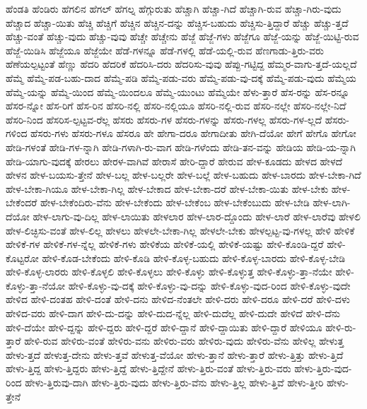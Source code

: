{ಹೆಂಡತಿ
ಹೆಂಡಿರು
ಹೆಗಲಿನ
ಹೆಗಲ್
ಹೆಗಲ್ನ
ಹೆಗ್ಗುರುತು
ಹೆಚ್ಚಾಗಿ
ಹೆಚ್ಚಾ-ಗಿದೆ
ಹೆಚ್ಚಾಗಿ-ರುವ
ಹೆಚ್ಚಾ-ಗಿರು-ವುದು
ಹೆಚ್ಚಾದ
ಹೆಚ್ಚಾ-ಯಿತು
ಹೆಚ್ಚಿ
ಹೆಚ್ಚಿಗೆ
ಹೆಚ್ಚಿನ
ಹೆಚ್ಚಿನ-ದನ್ನು
ಹೆಚ್ಚಿಸ-ಬಹುದು
ಹೆಚ್ಚಿಸು-ತ್ತಿದ್ದಾರೆ
ಹೆಚ್ಚು
ಹೆಚ್ಚು-ತ್ತದೆ
ಹೆಚ್ಚು-ವಂತೆ
ಹೆಚ್ಚು-ವುದು
ಹೆಚ್ಚು-ವುವು
ಹೆಚ್ಚೇ
ಹೆಚ್ಚೇನು
ಹೆಜ್ಜೆ
ಹೆಜ್ಜೆ-ಗಳು
ಹೆಜ್ಜೆಗೂ
ಹೆಜ್ಜೆ-ಯನ್ನು
ಹೆಜ್ಜೆ-ಯಿಟ್ಟಿ-ರುವ
ಹೆಜ್ಜೆ-ಯಿಡಿಸಿ
ಹೆಜ್ಜೆಯೂ
ಹೆಜ್ಜೆಯೇ
ಹೆಡೆ-ಗಳನ್ನೂ
ಹೆಡೆ-ಗಳಲ್ಲಿ
ಹೆಡೆ-ಯಲ್ಲಿ-ರುವ
ಹೆಣಗಾಡು-ತ್ತಿರು-ವರು
ಹೆಣೆಯಲ್ಪಟ್ಟಂತೆ
ಹೆಣ್ಣು
ಹೆದರಿ
ಹೆದರಿಕೆ
ಹೆದರಿಸಿ-ದರು
ಹೆದರಿಸು-ವುವು
ಹೆಪ್ಪು-ಗಟ್ಟಿದ್ದ
ಹೆಮ್ಮರ-ವಾಗು-ತ್ತದೆ-ಯಲ್ಲದೆ
ಹೆಮ್ಮೆ
ಹೆಮ್ಮೆ-ಪಡ-ಬಹು-ದಾದ
ಹೆಮ್ಮೆ-ಪಡಿ
ಹೆಮ್ಮೆ-ಪಡು-ವರು
ಹೆಮ್ಮೆ-ಪಡು-ವು-ದಕ್ಕೆ
ಹೆಮ್ಮೆ-ಪಡು-ವುದು
ಹೆಮ್ಮೆಯ
ಹೆಮ್ಮೆ-ಯನ್ನು
ಹೆಮ್ಮೆ-ಯಿಂದ
ಹೆಮ್ಮೆ-ಯಿಂದಲೂ
ಹೆಮ್ಮೆ-ಯುಂಟು
ಹೆಮ್ಮೆಯೇ
ಹೆಳು-ತ್ತಾರೆ
ಹೆಸ-ರನ್ನು
ಹೆಸ-ರನ್ನೂ
ಹೆಸರ-ನ್ನೋ
ಹೆಸ-ರಿಗೆ
ಹೆಸ-ರಿನ
ಹೆಸರಿ-ನಲ್ಲಿ
ಹೆಸರಿ-ನಲ್ಲಿಯೂ
ಹೆಸರಿ-ನಲ್ಲಿ-ರುವ
ಹೆಸರಿ-ನಲ್ಲೇ
ಹೆಸರಿ-ನಲ್ಲೇ-ನಿದೆ
ಹೆಸರಿ-ನಿಂದ
ಹೆಸರಿಸ-ಲ್ಪಟ್ಟವ-ರೆಲ್ಲ
ಹೆಸರು
ಹೆಸರು-ಗಳ
ಹೆಸರು-ಗಳನ್ನು
ಹೆಸರು-ಗಳಲ್ಲ
ಹೆಸರು-ಗಳ-ಲ್ಲದೆ
ಹೆಸರು-ಗಳಿಂದ
ಹೆಸರು-ಗಳು
ಹೆಸರು-ಗಳೂ
ಹೆಸರೂ
ಹೇ
ಹೇಗಾ-ದರೂ
ಹೇಗಾದೀತು
ಹೇಗಿ-ದೆಯೋ
ಹೇಗೆ
ಹೇಗೊ
ಹೇಗೋ
ಹೇಡಿ-ಗಳಂತೆ
ಹೇಡಿ-ಗಳ-ನ್ನಾಗಿ
ಹೇಡಿ-ಗಳಾಗಿ-ರು-ವಾಗ
ಹೇಡಿ-ಗಳೆಂದು
ಹೇಡಿ-ತನ-ವನ್ನು
ಹೇಡಿಯ
ಹೇಡಿ-ಯ-ನ್ನಾಗಿ
ಹೇಡಿ-ಯಾಗು-ವುದಕ್ಕೆ
ಹೇರಲು
ಹೇರಳ-ವಾಗಿವೆ
ಹೇರಾಸೆ
ಹೇರಿ-ದ್ದಾರೆ
ಹೇರುವ
ಹೇಳ-ಕೂಡದು
ಹೇಳದ
ಹೇಳದೆ
ಹೇಳನ
ಹೇಳ-ಬಯಸು-ತ್ತೇನೆ
ಹೇಳ-ಬಲ್ಲ
ಹೇಳ-ಬಲ್ಲರೇ
ಹೇಳ-ಬಲ್ಲೆ
ಹೇಳ-ಬಹುದು
ಹೇಳ-ಬಾರದು
ಹೇಳ-ಬೇಕಾ-ಗಿದೆ
ಹೇಳ-ಬೇಕಾ-ಗಿಯೂ
ಹೇಳ-ಬೇಕಾ-ಗಿಲ್ಲ
ಹೇಳ-ಬೇಕಾದ
ಹೇಳ-ಬೇಕಾ-ದರೆ
ಹೇಳ-ಬೇಕಾ-ಯಿತು
ಹೇಳ-ಬೇಕು
ಹೇಳ-ಬೇಕೆಂದರೆ
ಹೇಳ-ಬೇಕೆಂದಿರು-ವೆನು
ಹೇಳ-ಬೇಕೆಂದು
ಹೇಳ-ಬೇಕೆಂಬ
ಹೇಳ-ಬೇಕೆಂಬುದು
ಹೇಳ-ಬೇಡಿ
ಹೇಳ-ಲಾಗಿ-ದೆಯೋ
ಹೇಳ-ಲಾಗು-ವು-ದಿಲ್ಲ
ಹೇಳ-ಲಾಯಿತು
ಹೇಳಲಾರ
ಹೇಳ-ಲಾರ-ದ್ದೊಂದು
ಹೇಳ-ಲಾರೆ
ಹೇಳ-ಲಾರೆವು
ಹೇಳಲಿ
ಹೇಳ-ಲಿಚ್ಛಿಸು-ವಂತೆ
ಹೇಳ-ಲಿಲ್ಲ
ಹೇಳಲು
ಹೇಳಲೇ-ಬೇಕಾ-ಗಿಲ್ಲ
ಹೇಳಲೇ-ಬೇಕು
ಹೇಳಲ್ಪಟ್ಟ-ವು-ಗಳಲ್ಲ
ಹೇಳಿ
ಹೇಳಿಕೆ
ಹೇಳಿಕೆ-ಗಳ
ಹೇಳಿಕೆ-ಗಳ-ನ್ನೆಲ್ಲ
ಹೇಳಿಕೆ-ಗಳು
ಹೇಳಿಕೆಯ
ಹೇಳಿಕೆ-ಯಲ್ಲಿ
ಹೇಳಿಕೆ-ಯಷ್ಟು
ಹೇಳಿ-ಕೊಂಡಿ-ದ್ದರೆ
ಹೇಳಿ-ಕೊಟ್ಟರೋ
ಹೇಳಿ-ಕೊಡ-ಬೇಕೆಂದು
ಹೇಳಿ-ಕೊಡಿ
ಹೇಳಿ-ಕೊಳ್ಳ-ಬಹುದು
ಹೇಳಿ-ಕೊಳ್ಳ-ಬಾರದು
ಹೇಳಿ-ಕೊಳ್ಳ-ಬೇಡಿ
ಹೇಳಿ-ಕೊಳ್ಳ-ಲಾರರು
ಹೇಳಿ-ಕೊಳ್ಳಲಿ
ಹೇಳಿ-ಕೊಳ್ಳಲು
ಹೇಳಿ-ಕೊಳ್ಳು
ಹೇಳಿ-ಕೊಳ್ಳುತ್ತ
ಹೇಳಿ-ಕೊಳ್ಳು-ತ್ತಾ-ನೆಯೇ
ಹೇಳಿ-ಕೊಳ್ಳು-ತ್ತಾ-ನೆಯೋ
ಹೇಳಿ-ಕೊಳ್ಳು-ವು-ದಕ್ಕೆ
ಹೇಳಿ-ಕೊಳ್ಳು-ವು-ದನ್ನು
ಹೇಳಿ-ಕೊಳ್ಳು-ವುದ-ರಿಂದ
ಹೇಳಿ-ಕೊಳ್ಳು-ವುದೇ
ಹೇಳಿದ
ಹೇಳಿ-ದಂತಹ
ಹೇಳಿ-ದಂತೆ
ಹೇಳಿ-ದನು
ಹೇಳಿದ-ನೆಂತಲೇ
ಹೇಳಿ-ದರು
ಹೇಳಿ-ದರೂ
ಹೇಳಿ-ದರೆ
ಹೇಳಿ-ದಳು
ಹೇಳಿದ-ವರು
ಹೇಳಿ-ದಾಗ
ಹೇಳಿ-ದು-ದನ್ನು
ಹೇಳಿ-ದುದ-ನ್ನೆಲ್ಲ
ಹೇಳಿ-ದುದೆಲ್ಲ
ಹೇಳಿ-ದುದೇ
ಹೇಳಿದೆ
ಹೇಳಿ-ದೆನು
ಹೇಳಿ-ದೆಯೇ
ಹೇಳಿ-ದ್ದನ್ನು
ಹೇಳಿ-ದ್ದರು
ಹೇಳಿ-ದ್ದರೆ
ಹೇಳಿ-ದ್ದಾನೆ
ಹೇಳಿ-ದ್ದಾಯಿತು
ಹೇಳಿ-ದ್ದಾರೆ
ಹೇಳಿಯೂ
ಹೇಳಿ-ರು-ತ್ತಾರೆ
ಹೇಳಿ-ರುವ
ಹೇಳಿರು-ವಂತೆ
ಹೇಳಿರು-ವನು
ಹೇಳಿರು-ವರು
ಹೇಳಿರು-ವುದು
ಹೇಳಿರು-ವೆನು
ಹೇಳಿಲ್ಲ
ಹೇಳುತ್ತ
ಹೇಳು-ತ್ತದೆ
ಹೇಳುತ್ತ-ದೇನು
ಹೇಳು-ತ್ತವೆ
ಹೇಳುತ್ತ-ವೆಯೋ
ಹೇಳು-ತ್ತಾನೆ
ಹೇಳು-ತ್ತಾರೆ
ಹೇಳು-ತ್ತಿತ್ತು
ಹೇಳು-ತ್ತಿದೆ
ಹೇಳು-ತ್ತಿದ್ದ
ಹೇಳು-ತ್ತಿದ್ದರು
ಹೇಳು-ತ್ತಿದ್ದೆ
ಹೇಳು-ತ್ತಿದ್ದೇನೆ
ಹೇಳು-ತ್ತಿರು-ವಂತೆ
ಹೇಳು-ತ್ತಿರು-ವರು
ಹೇಳು-ತ್ತಿರು-ವುದ-ರಿಂದ
ಹೇಳು-ತ್ತಿರುವು-ದಾಗಿ
ಹೇಳು-ತ್ತಿರು-ವುದು
ಹೇಳು-ತ್ತಿರು-ವೆನು
ಹೇಳು-ತ್ತಿಲ್ಲ
ಹೇಳು-ತ್ತಿವೆ
ಹೇಳು-ತ್ತೀರಿ
ಹೇಳು-ತ್ತೇನೆ
}

